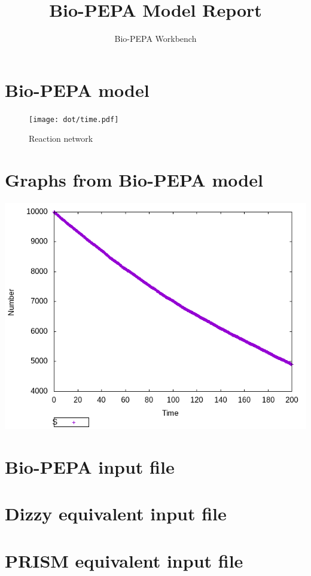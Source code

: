 \documentclass{llncs}
\title{Bio-PEPA Model Report}
\author{Bio-PEPA Workbench}
\institute{\today}
\begin{document}
\maketitle
\section{Bio-PEPA model}

\begin{figure}[htbp]
\begin{center}
\texttt{[image: dot/time.pdf]}
\caption{Reaction network}
\end{center}
\end{figure}
\newpage
\section{Graphs from Bio-PEPA model}
\includegraphics[scale=0.5]{png/time001_stochkit_results_0}
\appendix
\newpage
\section{Bio-PEPA input file}

\newpage
\section{Dizzy equivalent input file}

\newpage
\section{PRISM equivalent input file}

\end{document}
